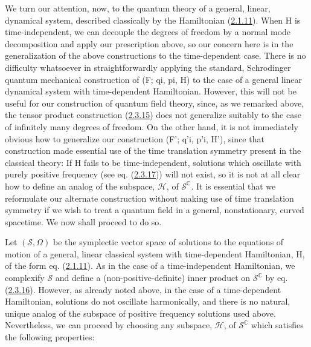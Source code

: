 \documentclass[11pt,a4paper]{article}
\begin{document}
We turn our attention, now, to the quantum theory of a general, linear, dynamical system, described classically by the Hamiltonian (\hyperref[eq:2.1.11]{2.1.11}). When H is time-independent, we can decouple the degrees of freedom by a normal mode decomposition and apply our prescription above, so our concern here is in the generalization of the above constructions to the time-dependent case. There is no difficulty whatsoever in straightforwardly applying the standard, Schrodinger quantum mechanical construction of (F; qi, pi, H) to the case of a general linear dynamical system with time-dependent Hamiltonian. However, this will not be useful for our construction of quantum field theory, since, as we remarked above, the tensor product construction (\hyperref[eq:2.3.15]{2.3.15}) does not generalize suitably to the case of infinitely many degrees of freedom. On the other hand, it is not immediately obvious how to generalize our construction (F'; q'i, p'i, H'), since that construction made essential use of the time translation symmetry present in the classical theory: If H fails to be time-independent, solutions which oscillate with purely positive frequency (see eq. (\hyperref[eq:2.3.17]{2.3.17})) will not exist, so it is not at all clear how to define an analog of the subspace, \(\mathcal{H}\), of \(\mathcal{S}^{\mathbb{C}}\). It is essential that we reformulate our alternate construction without making use of time translation symmetry if we wish to treat a quantum field in a general, nonstationary, curved spacetime. We now shall proceed to do so.

Let \((\mathcal{S},\Omega)\) be the symplectic vector space of solutions to the equations of motion of a general, linear classical system with time-dependent Hamiltonian, H, of the form eq. (\hyperref[eq:2.1.11]{2.1.11}). As in the case of a time-independent Hamiltonian, we complexify \(\mathcal{S}\) and define a (non-positive-definite) inner product on \(\mathcal{S}^{\mathbb{C}}\) by eq. (\hyperref[eq:2.3.16]{2.3.16}). However, as already noted above, in the case of a time-dependent Hamiltonian, solutions do not oscillate harmonically, and there is no natural, unique analog of the subspace of positive frequency solutions used above. Nevertheless, we can proceed by choosing any subspace, \(\mathcal{H}\), of \(\mathcal{S}^{\mathbb{C}}\) which satisfies the following properties:
\end{document}
